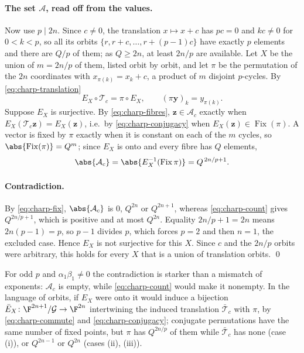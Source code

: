 \paragraph{The set $\mathcal A$, read off from the values.}
Now use $p\mid 2n$.  Since $c\neq0$, the translation $x\mapsto x+c$ has $pc=0$ and
$kc\neq0$ for $0<k<p$, so all its orbits $\{r,r+c,\dots,r+(p-1)c\}$ have exactly $p$
elements and there are $Q/p$ of them; as $Q\ge2n$, at least $2n/p$ are available.  Let
$X$ be the union of $m=2n/p$ of them, listed orbit by orbit, and let $\pi$ be the
permutation of the $2n$ coordinates with $x_{\pi(k)}=x_k+c$, a product of $m$ disjoint
$p$-cycles.  By \eqref{eq:charp-translation}
\begin{equation}
   E_X\circ\mathcal T_c=\pi\circ E_X,
   \qquad
   (\pi\mathbf y)_k=y_{\pi(k)} .
   \label{eq:charp-conjugacy}
\end{equation}
Suppose $E_X$ is surjective.  By \eqref{eq:charp-fibres}, $\mathbf z\in\mathcal A_c$
exactly when $E_X(\mathcal T_c\mathbf z)=E_X(\mathbf z)$, i.e.\ by
\eqref{eq:charp-conjugacy} when $E_X(\mathbf z)\in\operatorname{Fix}(\pi)$.  A vector is
fixed by $\pi$ exactly when it is constant on each of the $m$ cycles, so
$\abs{\operatorname{Fix}(\pi)}=Q^{m}$; since $E_X$ is onto and every fibre has $Q$
elements,
\begin{equation}
   \abs{\mathcal A_c}=\abs{E_X^{-1}(\operatorname{Fix}\pi)}=Q^{\,2n/p+1}.
   \label{eq:charp-count}
\end{equation}

\paragraph{Contradiction.}
By \eqref{eq:charp-fix}, $\abs{\mathcal A_c}$ is $0$, $Q^{2n}$ or $Q^{2n+1}$, whereas
\eqref{eq:charp-count} gives $Q^{2n/p+1}$, which is positive and at most $Q^{2n}$.  Equality
$2n/p+1=2n$ means $2n(p-1)=p$, so $p-1$ divides $p$, which forces $p=2$ and then $n=1$,
the excluded case.  Hence $E_X$ is not surjective for this $X$.  Since $c$ and the $2n/p$
orbits were arbitrary, this holds for every $X$ that is a union of translation orbits.
\qed

\medskip
For odd $p$ and $\alpha_1\beta_1\neq0$ the contradiction is starker than a mismatch of
exponents: $\mathcal A_c$ is empty, while \eqref{eq:charp-count} would make it nonempty.
In the language of orbits, if $E_X$ were onto it would induce a bijection
$\bar E_X\colon\F^{2n+1}/\mathcal G\to\F^{2n}$ intertwining the induced translation
$\bar{\mathcal T}_c$ with $\pi$, by \eqref{eq:charp-commute} and \eqref{eq:charp-conjugacy};
conjugate permutations have the same number of fixed points, but $\pi$ has $Q^{2n/p}$ of
them while $\bar{\mathcal T}_c$ has none (case (i)), or $Q^{2n-1}$ or $Q^{2n}$ (cases (ii),
(iii)).


